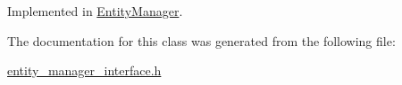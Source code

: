Implemented in \hyperlink{classEntityManager_a97a7e5a629a5ffe85a2859384e5ce701}{Entity\-Manager}.



The documentation for this class was generated from the following file\-:\begin{DoxyCompactItemize}
\item 
\hyperlink{entity__manager__interface_8h}{entity\-\_\-manager\-\_\-interface.\-h}\end{DoxyCompactItemize}

